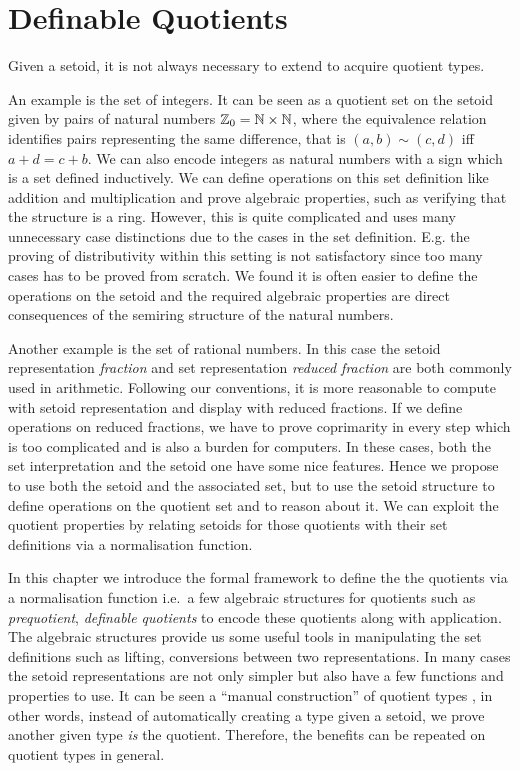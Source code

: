 \chapter{Definable Quotients}
\label{dq}



Given a setoid, it is not always necessary to extend \itt to acquire quotient types.

An example is the set of integers. It can be seen as a quotient set on
the setoid given by pairs of natural numbers
$\mathbb{Z}_0=\mathbb{N}\times\mathbb{N}$, where the equivalence relation identifies pairs
representing the same difference, that is  $(a,b)\sim(c,d)$ if{f}
$a+d=c+b$. 
We can also encode integers as natural 
numbers with a sign which is a set defined inductively.
We can define operations on this set definition like
addition and multiplication and prove algebraic properties,
such as verifying that the structure is a ring. 
However, this is quite complicated and uses many unnecessary case
distinctions due to the cases in the set definition. E.g. the proving of distributivity within this setting
is not satisfactory since too many cases has to be proved from
scratch. 
We found it is often easier to define the operations on the
setoid and the required algebraic properties are direct consequences
of the semiring structure of the natural numbers.

Another example is the set of rational numbers. In this case the setoid representation \emph{fraction} and set representation \emph{reduced fraction} are both commonly used in arithmetic. Following our conventions, it is more reasonable to compute with setoid representation and display with reduced fractions. If we define operations on reduced fractions, we have to prove coprimarity in every step which is too complicated and is also a burden for computers.
In these cases, both the set interpretation and the setoid one
have some nice features.
Hence we propose to use both the setoid
and the associated set, but to use the setoid structure to define
operations on the quotient set and to reason about it. We can exploit the quotient properties by relating setoids for those quotients with their set definitions via a normalisation function.


In this chapter we introduce the formal framework to define the
the quotients via a normalisation function i.e.\ a few algebraic structures for quotients such as \emph{prequotient}, \emph{definable quotients} to encode these quotients along with application.
The algebraic structures provide us some useful tools in manipulating the set definitions such as lifting, 
 conversions between two representations. In many cases the setoid representations are not only simpler but also have a few functions and properties to use. 
It can be seen a ``manual construction'' of quotient types
, in other words,
instead of automatically creating a type given a setoid, we
prove another given type \emph{is} the quotient. Therefore, the benefits can be repeated on quotient types in general.


